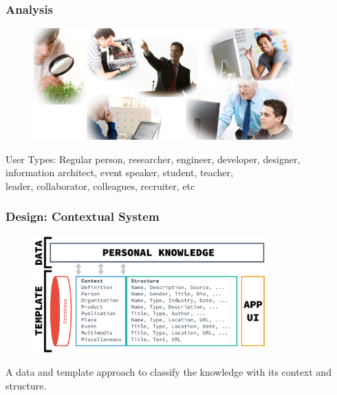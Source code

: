 \documentclass[10pt, compress]{beamer}
\begin{document}
\begin{frame}[fragile]
  \frametitle{Analysis}

  \begin{figure}[ht]
    \includegraphics[width=10cm]{include/users/types.jpg}
  \end{figure}

  \begin{block}{User Types:}
    Regular person, researcher, engineer, developer, designer,\\
    information architect, event speaker, student, teacher,\\
    leader, collaborator, colleagues, recruiter, etc
  \end{block}

\end{frame}


\begin{frame}[fragile]
  \frametitle{Design: Contextual System}

  \begin{figure}[ht]
    \centering
    \includegraphics[width=9cm]{include/satellid-contextual.png}
    \label{fig:satellid-contextual}
  \end{figure}

  A data and template approach to classify the knowledge with its context and structure.

\end{frame}

\end{document}

